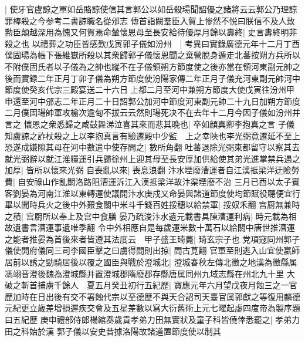 |{
	使牙官盧諒之軍如岳賂諒使信其言郭公以如岳殺瑒聞詔優之諸將云云郭公乃理諒罪棒殺之今参考二書諒職名從邠志}
傳首詣闕羣臣入賀上惨然不悦曰朕信不及人致勲臣顛越深用為愧又何賀焉命輦懷恩母至長安給待優厚月餘以壽終|{
	史言夀終明非殺之也}
以禮葬之功臣皆感歎戊寅郭子儀如汾州　|{
	考異曰實錄廣德元年十二月丁酉僕固瑒為帳下張維嶽所殺以其衆歸郭子儀懷恩聞之棄營脫身遁走北蕃按朔方兵所以不附僕固氏者以子儀為之帥也縱不在子儀領朔方節度使之後亦當在領河東副元帥之後而實録二年正月丁卯子儀為朔方節度使汾陽家傳二年正月子儀充河東副元帥河中節度使癸亥代宗三殿宴送二十六日上都二月至河中兼朔方節度大使戊寅往汾州甲申還至河中邠志二年正月二十日詔郭公加河中節度河東副元帥二十九日加朔方節度二月僕固瑒帥軍攻榆次逾甸不拔云云然則瑒死决不在去年十二月今因子儀如汾州并言之}
懷恩之衆悉歸之咸鼔舞涕泣喜其來而悲其晩也|{
	卒如顔真卿李抱真之言}
子儀知盧諒之詐杖殺之上以李抱真言有驗遷殿中少監　上之幸陜也李光弼竟遷延不至上恐遂成嫌隙其母在河中數遣中使存問之|{
	數所角翻}
吐蕃退除光弼東都留守以察其去就光弼辭以就江淮糧運引兵歸徐州上迎其母至長安厚加供給使其弟光進掌禁兵遇之加厚|{
	皆所以懷來光弼}
自喪亂以來|{
	喪息浪翻}
汴水堙廢漕運者自江漢抵梁洋迂險勞費|{
	自安祿山作亂關洛路阻漕運泝江入漢抵梁洋故汴渠堙廢不治}
三月已酉以太子賓客劉晏為河南江淮以東轉運使議開汴水庚戍又命晏與諸道節度使均節賦役聽便宜行畢以聞時兵火之後中外艱食關中米斗千錢百姓挼穗以給禁軍|{
	挼奴禾翻}
宫厨無兼時之積|{
	宫厨所以奉上及宫中食膳}
晏乃疏浚汴水遺元載書具陳漕運利病|{
	時元載為相故遺書言漕運事遺唯季翻}
令中外相應自是每歲運米數十萬石以給關中唐世推漕運之能者推晏為首後來者皆遵其法度云　甲子盛王琦薨|{
	琦玄宗子也}
党項寇同州郭子儀使開府儀同三司李國臣擊之曰虜得間則出掠|{
	間古莧翻}
官軍至則逃入山宜使嬴師居前以誘之勁騎居後以覆之國臣與戰於澄城北|{
	澄城春秋左傳北徵之地漢為徵縣属馮翊音澄後魏為澄城縣并置澄城郡隋廢郡存縣唐属同州九域志縣在州北九十里}
大破之斬首捕虜千餘人　夏五月癸丑初行五紀歷|{
	寶應元年六月望戊夜月蝕三之一官歷加時在日出後有交不署蝕代宗以至德歷不與天合詔司天臺官属郭獻之等復用麟德元紀更立歲差增損遲疾交會及五星差數以寫大衍舊術上元七曜起虚四度帝為製序題曰五紀歷}
庚申禮部侍郎楊綰奏歲貢孝弟力田無實狀及童子科皆僥倖悉罷之|{
	孝弟力田之科始於漢}
郭子儀以安史昔據洛陽故諸道置節度使以制其

